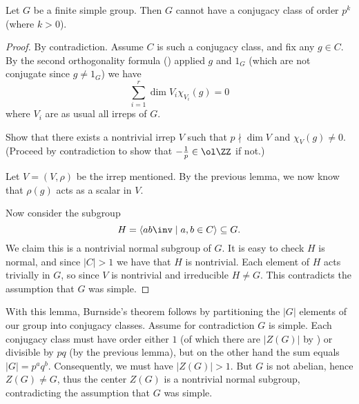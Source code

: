 \begin{lemma}
	Let $G$ be a finite simple group.
	Then $G$ cannot have a conjugacy class of order $p^k$ (where $k > 0$).
\end{lemma}
\begin{proof}
	By contradiction.
	Assume $C$ is such a conjugacy class, and fix any $g \in C$.
	By the second orthogonality formula ()
	applied $g$ and $1_G$ (which are not conjugate since $g \neq 1_G$) we have
	\[ \sum_{i=1}^r \dim V_i \chi_{V_i}(g) = 0 \]
	where $V_i$ are as usual all irreps of $G$.
	\begin{exercise}
		Show that there exists a nontrivial irrep $V$
		such that $p \nmid \dim V$ and $\chi_V(g) \neq 0$.
		(Proceed by contradiction to show that $-\frac1p \in \ol\ZZ$ if not.)
	\end{exercise}
	Let $V = (V, \rho)$ be the irrep mentioned.
	By the previous lemma, we now know that $\rho(g)$ acts as a scalar in $V$.

	Now consider the subgroup
	\[ H = \left< ab\inv \mid a,b \in C \right> \subseteq G. \]
	We claim this is a nontrivial normal subgroup of $G$.
	It is easy to check $H$ is normal,
	and since $|C| > 1$ we have that $H$ is nontrivial.
	Each element of $H$ acts trivially in $G$,
	so since $V$ is nontrivial and irreducible $H \neq G$.
	This contradicts the assumption that $G$ was simple.
\end{proof}

With this lemma, Burnside's theorem follows by partitioning
the $|G|$ elements of our group into conjugacy classes.
Assume for contradiction $G$ is simple.
Each conjugacy class must have order either $1$ (of which there are $|Z(G)|$ by )
or divisible by $pq$ (by the previous lemma), but on the other hand the sum equals $|G| = p^aq^b$.
Consequently, we must have $|Z(G)| > 1$.
But $G$ is not abelian, hence $Z(G) \neq G$,
thus the center $Z(G)$ is a nontrivial normal subgroup,
contradicting the assumption that $G$ was simple.



